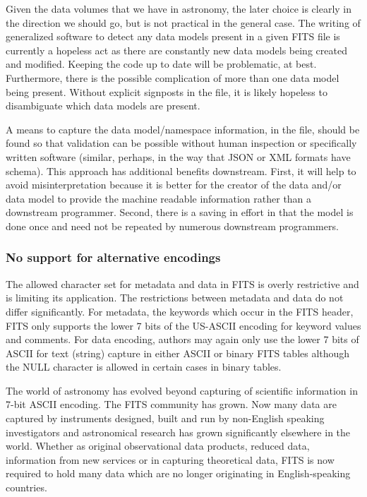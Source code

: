\documentclass[final,authoryear,5p,times,twocolumn]{elsarticle}
\begin{document}
Given the data volumes that we have in astronomy, the later choice is
clearly in the direction we should go, but is not practical in the
general case. The writing of generalized software to detect any data
models present in a given FITS file is currently a hopeless act as
there are constantly new data models being created and
modified. Keeping the code up to date will be problematic, at
best. Furthermore, there is the possible complication of more than one
data model being present. Without explicit signposts in the file, it
is likely hopeless to disambiguate which data models are present.


A means to capture the data model/namespace information, in the file,
should be found so that validation can be possible without human
inspection or specifically written software (similar, perhaps, in the
way that JSON or XML formats have schema). This approach has
additional benefits downstream. First, it will help to avoid
misinterpretation because it is better for the creator of the data
and/or data model to provide the machine readable information rather
than a downstream programmer. Second, there is a saving in effort
in that the model is done once and need not be repeated by numerous
downstream programmers.

\subsubsection{No support for alternative encodings}


The allowed character set for metadata and data in FITS is overly
restrictive and is limiting its application. The restrictions between
metadata and data do not differ significantly. For metadata, the
keywords which occur in the FITS header, FITS only supports the lower
7 bits of the US-ASCII encoding for keyword values and comments. For
data encoding, authors may again only use the lower 7 bits of ASCII
for text (string) capture in either ASCII or binary FITS tables
although the NULL character is allowed in certain cases in binary
tables.


The world of astronomy has evolved beyond capturing of scientific
information in 7-bit ASCII encoding. The FITS community has grown. Now
many data are captured by instruments designed, built and run by
non-English speaking investigators and astronomical research has grown
significantly elsewhere in the world. Whether as original
observational data products, reduced data, information from new
services or in capturing theoretical data, FITS is now required to
hold many data which are no longer originating in English-speaking
countries.
\end{document}
